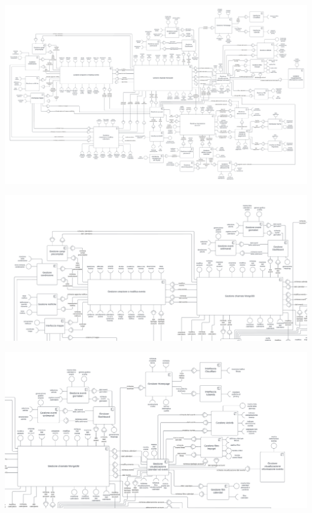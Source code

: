 \begin{center}
    \includegraphics[width=1\textwidth,height=0.4\textheight]{img/Diagrammi/Componenti/Diagramma_dei_componenti.png}
\end{center}
\begin{center}
    \includegraphics[width=1\textwidth,height=0.4\textheight]{img/Diagrammi/Componenti/P1_Diagramma_dei_componenti.png}
\end{center}
\begin{center}
    \includegraphics[width=1\textwidth,height=0.4\textheight]{img/Diagrammi/Componenti/P2_Diagramma_dei_componenti.png}
\end{center}
